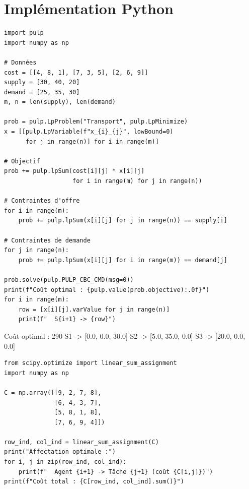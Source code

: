 \section{Impl\'ementation Python}

\begin{codeblock}[title=\textbf{Probl\`eme de transport avec PuLP}]
\begin{verbatim}
import pulp
import numpy as np

# Données
cost = [[4, 8, 1], [7, 3, 5], [2, 6, 9]]
supply = [30, 40, 20]
demand = [25, 35, 30]
m, n = len(supply), len(demand)

prob = pulp.LpProblem("Transport", pulp.LpMinimize)
x = [[pulp.LpVariable(f"x_{i}_{j}", lowBound=0)
      for j in range(n)] for i in range(m)]

# Objectif
prob += pulp.lpSum(cost[i][j] * x[i][j]
                   for i in range(m) for j in range(n))

# Contraintes d'offre
for i in range(m):
    prob += pulp.lpSum(x[i][j] for j in range(n)) == supply[i]

# Contraintes de demande
for j in range(n):
    prob += pulp.lpSum(x[i][j] for i in range(m)) == demand[j]

prob.solve(pulp.PULP_CBC_CMD(msg=0))
print(f"Coût optimal : {pulp.value(prob.objective):.0f}")
for i in range(m):
    row = [x[i][j].varValue for j in range(n)]
    print(f"  S{i+1} -> {row}")
\end{verbatim}
\end{codeblock}

\begin{codeoutput}
Coût optimal : 290
  S1 -> [0.0, 0.0, 30.0]
  S2 -> [5.0, 35.0, 0.0]
  S3 -> [20.0, 0.0, 0.0]
\end{codeoutput}

\begin{codeblock}[title=\textbf{Probl\`eme d'affectation avec SciPy}]
\begin{verbatim}
from scipy.optimize import linear_sum_assignment
import numpy as np

C = np.array([[9, 2, 7, 8],
              [6, 4, 3, 7],
              [5, 8, 1, 8],
              [7, 6, 9, 4]])

row_ind, col_ind = linear_sum_assignment(C)
print("Affectation optimale :")
for i, j in zip(row_ind, col_ind):
    print(f"  Agent {i+1} -> Tâche {j+1} (coût {C[i,j]})")
print(f"Coût total : {C[row_ind, col_ind].sum()}")
\end{verbatim}
\end{codeblock}

